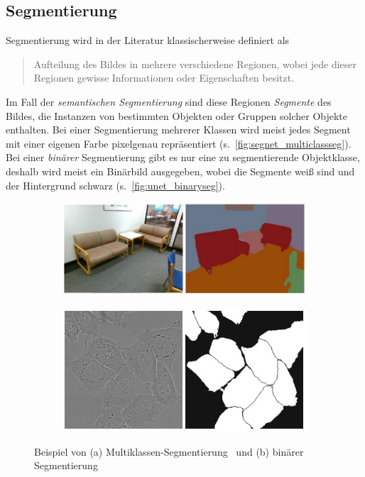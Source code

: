 \subsection{Segmentierung}

Segmentierung wird in der Literatur klassischerweise definiert als

\begin{quote}Aufteilung des Bildes in mehrere verschiedene Regionen, wobei jede dieser Regionen gewisse Informationen oder Eigenschaften besitzt.~\cite[S.~29]{Ens.2011}\end{quote}

Im Fall der \emph{semantischen Segmentierung} sind diese Regionen \emph{Segmente} des Bildes, die Instanzen von bestimmten Objekten oder Gruppen solcher Objekte enthalten.
Bei einer Segmentierung mehrerer Klassen wird meist jedes Segment mit einer eigenen Farbe pixelgenau repräsentiert (s.~\autoref{fig:segnet_multiclassseg}).
Bei einer \emph{binärer} Segmentierung gibt es nur eine zu segmentierende Objektklasse, deshalb wird meist ein Binärbild ausgegeben, wobei die Segmente weiß sind und der Hintergrund schwarz (s.~\autoref{fig:unet_binaryseg}).

\begin{figure}
	\centering
	\begin{subfigure}{.48\textwidth}
		\centering
		\includegraphics[width=\linewidth]{img/segnet_multiclassseg}
		\caption{}
		\label{fig:segnet_multiclassseg}
	\end{subfigure}
	\begin{subfigure}{.48\textwidth}
		\centering
		\includegraphics[width=\linewidth]{img/unet_binaryseg}
		\caption{}
		\label{fig:unet_binaryseg}
	\end{subfigure}
	\caption[Beispiel von Multiklassen-Segmentierung und binärer Segmentierung]{Beispiel von (a) Multiklassen-Segmentierung~\cite{Badrinarayanan.2017} und (b) binärer Segmentierung~\cite{Ronneberger.2015}}
\end{figure}

